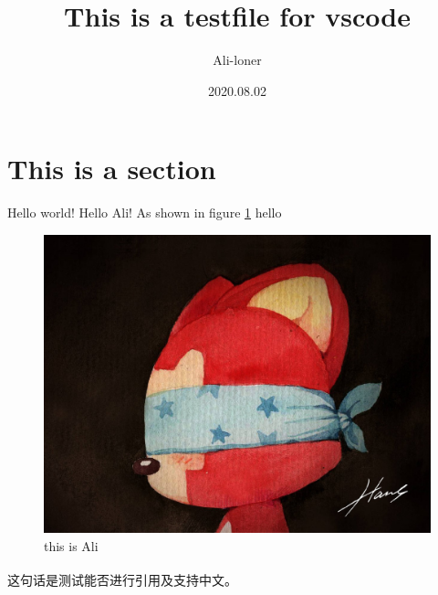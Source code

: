 \documentclass[fontset=windows]{article}
\title{\heiti\zihao{2} This is a testfile for vscode}
\author{\songti Ali-loner}
\date{2020.08.02}
\newcommand{\upcite}[1]{\textsuperscript{\cite{#1}}}
\begin{document}
	\maketitle
	\thispagestyle{empty}

\begin{abstract}
	\lipsum[2]
\end{abstract}

\tableofcontents

\section{This is a section}
Hello world! Hello Ali! As shown in figure \ref{1}
hello
\begin{figure}[htbp]
	\centering
	\includegraphics[scale=0.2]{Ali.jpg}
	\caption{this is Ali}
	\label{1}
\end{figure}

这句话是测试能否进行引用及支持中文\upcite{1}。

\end{document}
